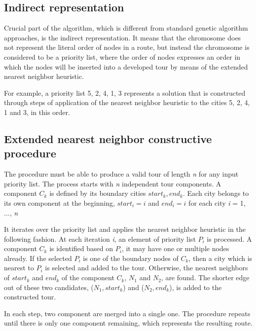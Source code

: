 \documentclass[oneside]{ctuthesis}
\theoremstyle{plain}
\theoremstyle{definition}
\theoremstyle{note}
\begin{document}
\subsection{Indirect representation}
Crucial part of the algorithm, which is different from standard genetic algorithm approaches, is the indirect representation. It means that the chromosome does not represent the literal order of nodes in a route, but instead the chromosome is considered to be a priority list, where the order of nodes expresses an order in which the nodes will be inserted into a developed tour by means of the extended nearest neighbor heuristic.

For example, a priority
list {5, 2, 4, 1, 3} represents a solution that is constructed
through steps of application of the nearest neighbor heuristic
to the cities 5, 2, 4, 1 and 3, in this order.

\subsection{Extended nearest neighbor constructive procedure}
The procedure must be able to produce a valid tour of length \emph{n} for any input priority list.
The process starts with \emph{n} independent tour components. A component \emph{$ C_k $} is defined by its boundary cities {\emph{$ start_k, end_k $}}. Each city belongs to its own component at the beginning, \emph{$ start_i = i $} and \emph{$ end_i = i  $} for each city \emph{i} = 1, ..., \emph{n}

It iterates over the priority list and applies the nearest neighbor heuristic in the following fashion. At each iteration \emph{i}, an element of priority list \emph{$ P_i $} is processed. A component \emph{$ C_k $} is identified based on \emph{$ P_i $}, it may have one or multiple nodes already. If the selected \emph{$ P_i $} is one of the boundary nodes of \emph{$ C_k $}, then a city which is nearest to \emph{$ P_i $} is selected and added to the tour. Otherwise, the nearest neighbors of \emph{$ start_k $} and \emph{$ end_k $} of the component \emph{$ C_k $}, \emph{$ N_1 $} and \emph{$ N_2 $}, are found.
The shorter edge out of these two candidates, (\emph{$ N_1, start_k $}) and (\emph{$ N_2, end_k $}), is added to the constructed tour. 

In each step, two component are merged into a single one. The procedure repeats until there is only one component remaining, which represents the resulting route.
\end{document}
